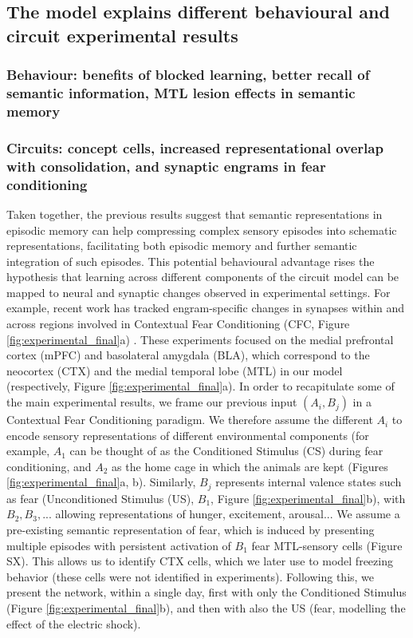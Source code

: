 \documentclass{article}
\begin{document}
\subsection*{The model explains different behavioural and circuit experimental results}
\subsubsection*{Behaviour: benefits of blocked learning, better recall of semantic information, MTL lesion effects in semantic memory}
\subsubsection*{Circuits: concept cells, increased representational overlap with consolidation, and synaptic engrams in fear conditioning}
Taken together, the previous results suggest that semantic representations in episodic memory can help compressing complex sensory episodes into schematic representations, facilitating both episodic memory and further semantic integration of such episodes. This potential behavioural advantage rises the hypothesis that learning across different components of the circuit model can be mapped to neural and synaptic changes observed in experimental settings.
\newline\newline
For example, recent work has tracked engram-specific changes in synapses within and across regions involved in Contextual Fear Conditioning (CFC, Figure \ref{fig:experimental_final}a) . These experiments focused on the medial prefrontal cortex (mPFC) and basolateral amygdala (BLA), which correspond to the neocortex (CTX) and the medial temporal lobe (MTL) in our model (respectively, Figure \ref{fig:experimental_final}a). In order to recapitulate some of the main experimental results, we frame our previous input $(A_i, B_j)$ in a Contextual Fear Conditioning paradigm. We therefore assume the different $A_i$ to encode sensory representations of different environmental components (for example, $A_1$ can be thought of as the Conditioned Stimulus (CS) during fear conditioning, and $A_2$ as the home cage in which the animals are kept (Figures \ref{fig:experimental_final}a, b). Similarly, $B_j$ represents internal valence states such as fear (Unconditioned Stimulus (US), $B_1$, Figure \ref{fig:experimental_final}b), with $B_2, B_3, ...$ allowing representations of hunger, excitement, arousal... We assume a pre-existing semantic representation of fear, which is induced by presenting multiple episodes with persistent activation of $B_1$ fear MTL-sensory cells (Figure SX). This allows us to identify CTX  cells, which we later use to model freezing behavior (these cells were not identified in experiments). Following this, we present the network, within a single day, first with only the Conditioned Stimulus (Figure \ref{fig:experimental_final}b), and then with also the US (fear, modelling the effect of the electric shock).
\end{document}
